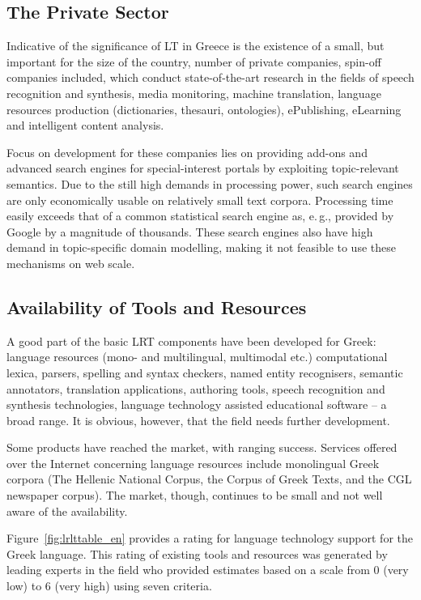 \begin{multicols}{2}
\subsection{The Private Sector}

Indicative of the significance of LT in Greece is the existence of a small, but important for the size of the country, number of private companies, spin-off companies included, which conduct state-of-the-art research in the fields of speech recognition and synthesis, media monitoring, machine translation, language resources production (dictionaries, thesauri, ontologies), ePublishing, eLearning and intelligent content analysis.

Focus on development for these companies lies on providing add-ons and advanced search engines for special-interest portals by exploiting topic-relevant semantics. Due to the still high demands in processing power, such search engines are only economically usable on relatively small text corpora. Processing time easily exceeds that of a common statistical search engine as, e.\,g., provided by Google by a magnitude of thousands. These search engines also have high demand in topic-specific domain modelling, making it not feasible to use these mechanisms on web scale.

\subsection{Availability of Tools and Resources}

A good part of the basic LRT components have been developed for Greek: language resources (mono- and multilingual, multimodal etc.) computational lexica, parsers, spelling and syntax checkers, named entity recognisers, semantic annotators, translation applications, authoring tools, speech recognition and synthesis technologies, language technology assisted educational software -- a broad range. It is obvious, however, that the field needs further development.

Some products have reached the market, with ranging success. Services offered over the Internet concerning language resources include monolingual Greek corpora (The Hellenic National Corpus, the Corpus of Greek Texts, and the CGL newspaper corpus). The market, though, continues to be small and not well aware of the availability.

Figure~\ref{fig:lrlttable_en} provides a rating for language technology support for the Greek language. This rating of existing tools and resources was generated by leading experts in the field who provided estimates based on a scale from 0 (very low) to 6 (very high) using seven criteria.


\end{multicols}
